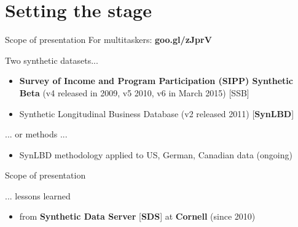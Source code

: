 \section[Background]{Setting the stage}


\newcommand{\mydraws}{  \node[draw, circle, fill=black!10 ] at ({360/\n * (\s - 1)}:\radius) {\label};
  \draw[->, >=latex] ({360/\n * (\s - 1)+\margin}:\radius) 
    arc ({360/\n * (\s - 1)+\margin}:{360/\n * (\s)-\margin}:\radius);
}



\begin{frame}[<+->]{Scope of presentation}
For multitaskers: {\bf goo.gl/zJprV}
\begin{block}{Two synthetic datasets...}
\begin{itemize}[<+->]
\item {\bf Survey of Income and Program Participation (SIPP) Synthetic Beta} (v4 released in 
2009, v5 2010, v6 in March 2015) [SSB]
\item Synthetic Longitudinal Business Database (v2 released 2011) [{\bf SynLBD}]
\end{itemize}
\end{block}
\begin{block}{... or methods ...}
\begin{itemize}[<+->]
\item SynLBD methodology applied to US, German, Canadian data (ongoing)
\end{itemize}
\end{block}
\end{frame}


\begin{frame}[<+->]{Scope of presentation}
\begin{block}{... lessons learned}
\begin{itemize}[<+->]
\item from {\bf Synthetic Data Server} [{\bf SDS}] at {\bf Cornell}  (since 2010)
\end{itemize}
\end{block}
\end{frame}





